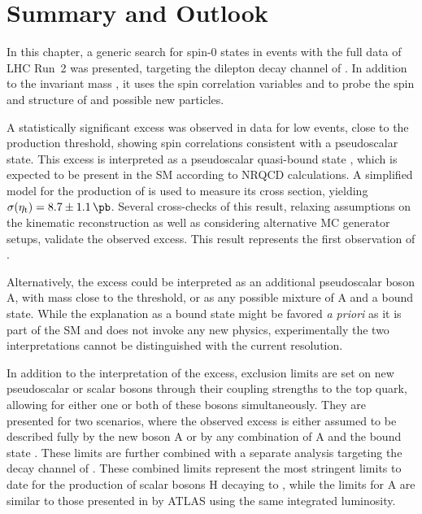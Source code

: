 
\section{Summary and Outlook}
\label{sec:ah:summary}

In this chapter, a generic search for spin-0 states in \ttbar events with the full data of LHC Run~2 was presented, targeting the dilepton decay channel of \ttbar. In addition to the invariant mass \mtt, it uses the spin correlation variables \chel and \chan to probe the spin and \CP structure of \ttbar and possible new particles.

A statistically significant excess was observed in data for low \mtt events, close to the \ttbar production threshold, showing spin correlations consistent with a pseudoscalar state. This excess is interpreted as a pseudoscalar \ttbar quasi-bound state \etat, which is expected to be present in the SM according to NRQCD calculations. A simplified model for the production of \etat is used to measure its cross section, yielding $\sigetat = 8.7 \pm 1.1\,\si{\pb}$. Several cross-checks of this result, relaxing assumptions on the \ttbar kinematic reconstruction as well as considering alternative MC generator setups, validate the observed excess. This result represents the first observation of \etat.

Alternatively, the excess could be interpreted as an additional pseudoscalar boson A, with mass close to the \ttbar threshold, or as any possible mixture of A and a \ttbar bound state. While the explanation as a \ttbar bound state might be favored \textit{a priori} as it is part of the SM and does not invoke any new physics, experimentally the two interpretations cannot be distinguished with the current resolution.

In addition to the interpretation of the excess, exclusion limits are set on new pseudoscalar or scalar bosons \AH through their coupling strengths to the top quark, allowing for either one or both of these bosons simultaneously. They are presented for two scenarios, where the observed excess is either assumed to be described fully by the new boson A or by any combination of A and the bound state \etat. These limits are further combined with a separate analysis targeting the \ljets decay channel of \ttbar. These combined limits represent the most stringent limits to date for the production of scalar bosons H decaying to \ttbar, while the limits for A are similar to those presented in  by ATLAS using the same integrated luminosity.

